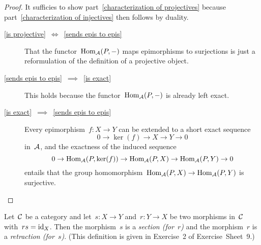 \begin{proof}
  It sufficies to show part~\ref*{characterization of projectives} because part~\ref*{characterization of injectives} then follows by duality.
  
  \begin{description}
    \item[\ref*{is projective}~$\iff$~\ref*{sends epis to epis}]
      That the functor~$\operatorname{Hom}_{\mathcal{A}}(P,-)$ maps epimorphisms to surjections is just a reformulation of the definition of a projective object.
    \item[\ref*{sends epis to epis}~$\implies$~\ref*{is exact}]
      This holds because the functor~$\operatorname{Hom}_{\mathcal{A}}(P,-)$ is already left exact.
    \item[\ref*{is exact}~$\implies$~\ref*{sends epis to epis}]
      Every epimorphism~$f \colon X \to Y$ can be extended to a short exact sequence
      \[
        0
        \to
        \ker(f)
        \to
        X
        \to
        Y
        \to
        0
      \]
      in~$\mathcal{A}$, and the exactness of the induced sequence
      \[
        0
        \to
        \operatorname{Hom}_{\mathcal{A}}(P,\ker(f))
        \to
        \operatorname{Hom}_{\mathcal{A}}(P,X)
        \to
        \operatorname{Hom}_{\mathcal{A}}(P,Y)
        \to
        0
      \]
      entails that the group homomorphism~$\operatorname{Hom}_{\mathcal{A}}(P,X) \to \operatorname{Hom}_{\mathcal{A}}(P,Y)$ is surjective.
    \qedhere
  \end{description}
\end{proof}




\begin{definition*}
  Let~$\mathcal{C}$ be a category and let~$s \colon X \to Y$ and~$r \colon Y \to X$ be two morphisms in~$\mathcal{C}$ with~$rs = \operatorname{id}_X$.
  Then the morphism~$s$ is a \emph{section \textup(for~$r$\textup)} and the morphism~$r$ is a \emph{retraction \textup(for~$s$\textup)}.
  (This definition is given in Exercise~2 of Exercise~Sheet~9.)
\end{definition*}


